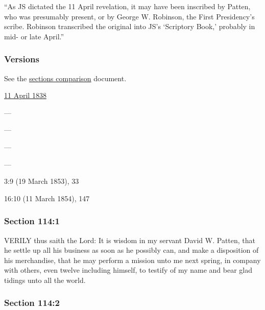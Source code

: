 			``As JS dictated the 11 April revelation, it may have been inscribed by Patten, who was presumably present, or by George W. Robinson, the First Presidency's scribe. Robinson transcribed the original into JS's `Scriptory Book,' probably in mid- or late April.''
					
	\subsubsection{Versions}
		\label{DC114-V}
		
		See the \href{https://drive.google.com/file/d/1goAvNz8jS4R8slYfMG_db55Ty2z_vmgK/view?usp=sharing}{sections comparison} document.
	
		\begin{compactdesc}
			\item[JSP] \hyperref[EMS-1838-JS-11-APR-1838]{11 April 1838}
			\item[BC] ---
			\item[DC 1835] ---
			\item[DC 1844] ---
			\item[TS] ---
			\item[DN] 3:9 (19 March 1853), 33
			\item[MS] 16:10 (11 March 1854), 147
		\end{compactdesc}

	\subsubsection{Section 114:1} %
		\label{DC114-1}

		VERILY thus saith the Lord: It is wisdom in my servant David W. Patten, that he settle up all his business as soon as he possibly can, and make a disposition of his merchandise, that he may perform a mission unto me next spring, in company with others, even twelve including himself, to testify of my name and bear glad tidings unto all the world.


	\subsubsection{Section 114:2} %
		\label{DC114-2}

